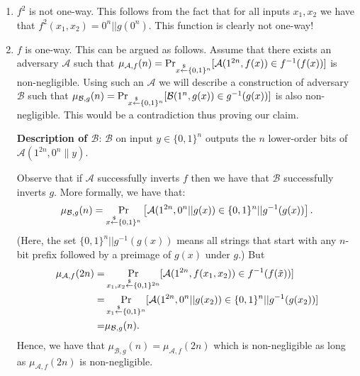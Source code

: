 \begin{enumerate} 
  \item $f^2$ is not one-way. This follows from the fact that for all inputs $x_1, x_2$ we have that $f^2(x_1,x_2) = 0^n || g(0^n)$. This function is clearly not one-way!
  \item $f$ is one-way. This can be argued as follows. Assume that there exists an adversary $\mathcal{A}$ such that $\mu_{\mathcal{A},f}(n) = \Pr_{x \stackrel{\$}{\leftarrow} \{0,1\}^{n}}[ \mathcal{A}(1^{2n}, f(x)) \in f^{-1}(f(x))]$ is non-negligible. Using such an $\mathcal{A}$ we will describe a construction of adversary $\mathcal{B}$ such that $\allowbreak\mu_{\mathcal{B},g}(n) = \Pr_{x \stackrel{\$}{\leftarrow} \{0,1\}^{n}}[ \mathcal{B}(1^n, g(x)) \in g^{-1}(g(x))]$ is also non-negligible. This would be a contradiction thus proving our claim.

      \textbf{Description of $\mathcal{B}$}: $\mathcal{B}$ on input $y \in\{0,1\}^n$ outputs the $n$ lower-order bits of  $\mathcal{A}(1^{2n}, 0^{n}\|y)$.

      Observe that if $\mathcal{A}$ successfully inverts $f$ then we have that $\mathcal{B}$ successfully inverts $g$. More formally, we have that:
      $$\mu_{\mathcal{B},g}(n) = \Pr_{x \stackrel{\$}{\leftarrow} \{0,1\}^{n}}\left[ \mathcal{A}(1^{2n}, 0^n || g(x)) \in \{0,1\}^n || g^{-1}(g(x))\right].$$ (Here, the set $\{0,1\}^n || g^{-1}(g(x))$ means all strings that start with any $n$-bit prefix followed by a preimage of $g(x)$ under $g$.)
      But
      \begin{align*}
      \mu_{\mathcal{A},f}(2n) =& \Pr_{x_1, x_2 \stackrel{\$}{\leftarrow} \{0,1\}^{2n}}[ \mathcal{A}(1^{2n}, f(x_1, x_2)) \in f^{-1}(f(\tilde x))]\\
      = & \Pr_{x_1 \stackrel{\$}{\leftarrow} \{0,1\}^{n}}[ \mathcal{A}(1^{2n}, 0^n || g(x_2)) \in \{0,1\}^n || g^{-1}(g(x_2))] \\
      = & \mu_{\mathcal{B},g}(n).
      \end{align*}
      Hence, we have that $\mu_{\mathcal{B},g}(n) = \mu_{\mathcal{A},f}(2n)$ which is non-negligible as long as $\mu_{\mathcal{A},f}(2n)$  is non-negligible.
\end{enumerate}


%

